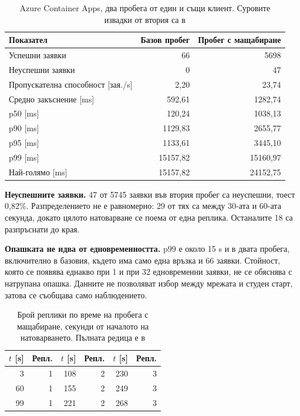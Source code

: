 \begin{table}[H]
\caption{Azure Container Apps, два пробега от един и същи клиент. Суровите извадки от втория са в
}
\label{tab:azure}
\centering
\small
\begin{tabular}{@{}lrr@{}}
\toprule
\textbf{Показател} & \textbf{Базов пробег} & \textbf{Пробег с мащабиране} \\
\midrule
Успешни заявки             & 66      & 5698     \\
Неуспешни заявки           & 0       & 47       \\
Пропускателна способност [зая./s] & 2{,}20 & 23{,}74 \\
Средно закъснение [ms]     & 592{,}61   & 1282{,}74 \\
p50 [ms]                   & 120{,}24   & 1038{,}13 \\
p90 [ms]                   & 1129{,}83  & 2655{,}77 \\
p95 [ms]                   & 1133{,}61  & 3445{,}10 \\
p99 [ms]                   & 15157{,}82 & 15160{,}97 \\
Най-голямо [ms]            & 15157{,}82 & 24152{,}75 \\
\bottomrule
\end{tabular}
\end{table}

\textbf{Неуспешните заявки.} 47 от 5745 заявки във втория пробег са неуспешни, тоест 0{,}82\%. Разпределението
не е равномерно: 29 от тях са между 30-ата и 60-ата секунда, докато цялото натоварване се поема от
една реплика. Останалите 18 са разпръснати до края.

\textbf{Опашката не идва от едновременността.} p99 е около 15 s и в двата пробега, включително в
базовия, където има само една връзка и 66 заявки. Стойност, която се появява еднакво при 1 и при 32
едновременни заявки, не се обяснява с натрупана опашка. Данните не позволяват избор между мрежата
и студен старт, затова се съобщава само наблюдението.

\begin{table}[H]
\caption{Брой реплики по време на пробега с мащабиране, секунди от началото на натоварването.
Пълната редица е в }
\label{tab:azure-replicas}
\centering
\small
\begin{tabular}{@{}rr@{\hspace{1.2cm}}rr@{\hspace{1.2cm}}rr@{}}
\toprule
\textbf{$t$ [s]} & \textbf{Репл.} & \textbf{$t$ [s]} & \textbf{Репл.} &
\textbf{$t$ [s]} & \textbf{Репл.} \\
\midrule
3   & 1 & 108 & 2 & 230 & 3 \\
60  & 1 & 155 & 2 & 249 & 3 \\
99  & 1 & 221 & 2 & 268 & 3 \\
\bottomrule
\end{tabular}
\end{table}

